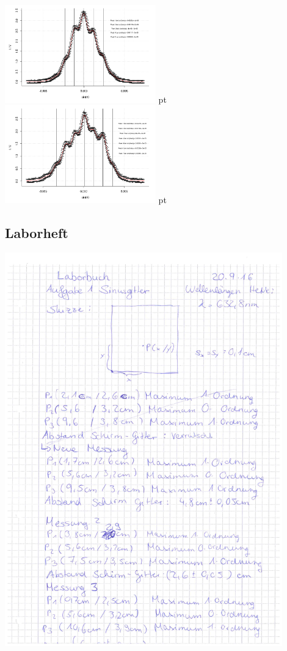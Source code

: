 \documentclass[12pt]{article}
\begin{document}
\begin{minipage}[h!]{\textwidth}
	\includegraphics[width=0.49\textwidth]{figures/ultraschall11.png} pt
	\includegraphics[width=0.49\textwidth]{figures/ultraschall12.png} pt
\end{minipage}\newpage
\subsection{Laborheft\label{Laborheft}} 
\begin{minipage}{\textwidth}
\centering
\includegraphics[width=0.9\textwidth]{figures/Laborbuch2.pdf}
\end{minipage}
\end{document}
